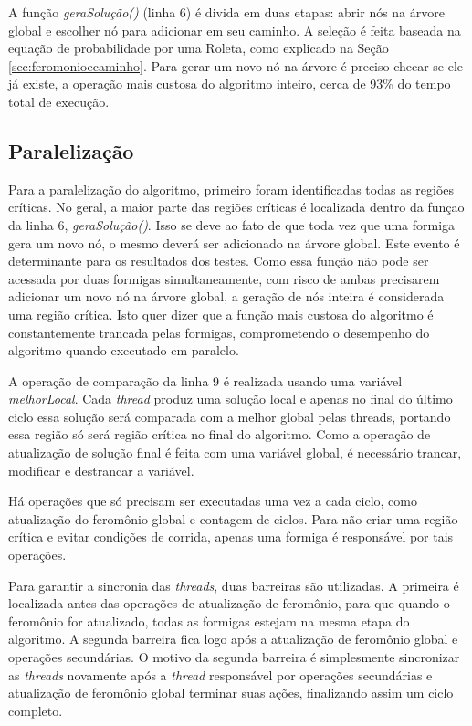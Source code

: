 \documentclass[12pt]{article}
\begin{document}
A função \textit{geraSolução()} (linha 6) é divida em duas etapas: abrir nós na árvore global e escolher nó para adicionar em seu caminho. A seleção é feita baseada na equação de probabilidade por uma Roleta, como explicado na Seção \ref{sec:feromonioecaminho}. Para gerar um novo nó na árvore é preciso checar se ele já existe, a operação mais custosa do algoritmo inteiro, cerca de 93\% do tempo total de execução. 

\subsection{Paralelização}\label{sec:paralelizacao}
Para a paralelização do algoritmo, primeiro foram identificadas todas as regiões críticas. No geral, a maior parte das regiões críticas é localizada dentro da funçao da linha 6, \textit{geraSolução()}. Isso se deve ao fato de que toda vez que uma formiga gera um novo nó, o mesmo deverá ser adicionado na árvore global. Este evento é determinante para os resultados dos testes. Como essa função não pode ser acessada por duas formigas simultaneamente, com risco de ambas precisarem adicionar um novo nó na árvore global, a geração de nós inteira é considerada uma região crítica. Isto quer dizer que a função mais custosa do algoritmo é constantemente trancada pelas formigas, comprometendo o desempenho do algoritmo quando executado em paralelo.

A operação de comparação da linha 9 é realizada usando uma variável \textit{melhorLocal}. Cada \textit{thread} produz uma solução local e apenas no final do último ciclo essa solução será comparada com a melhor global pelas threads, portando essa região só será região crítica no final do algoritmo. Como a operação de atualização de solução final é feita com uma variável global, é necessário trancar, modificar e destrancar a variável.

Há operações que só precisam ser executadas uma vez a cada ciclo, como atualização do feromônio global e contagem de ciclos. Para não criar uma região crítica e evitar condições de corrida, apenas uma formiga é responsável por tais operações.

Para garantir a sincronia das \textit{threads}, duas barreiras são utilizadas. A primeira é localizada antes das operações de atualização de feromônio, para que quando o feromônio for atualizado, todas as formigas estejam na mesma etapa do algoritmo. A segunda barreira fica logo após a atualização de feromônio global e operações secundárias. O motivo da segunda barreira é simplesmente sincronizar as \textit{threads} novamente após a \textit{thread} responsável por operações secundárias e atualização de feromônio global terminar suas ações, finalizando assim um ciclo completo.
\end{document}
